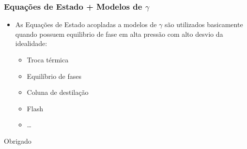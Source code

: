 \documentclass[aspectratio=169]{beamer}
\begin{document}
\begin{frame}
  \frametitle{Equações de Estado + Modelos de $\gamma$}
  \begin{itemize}
    \item As Equações de Estado acopladas a modelos de $\gamma$ são utilizados
    basicamente quando possuem equilibrio de fase em alta pressão com alto
    desvio da idealidade:
    \begin{itemize}
      \item Troca térmica
      \item Equilíbrio de fases
       \item Coluna de destilação
      \item Flash
      \item \ldots
    \end{itemize}
    \end{itemize}

\end{frame}

\begin{frame}
\Huge{\centerline{Obrigado}}
\end{frame}
\end{document}
